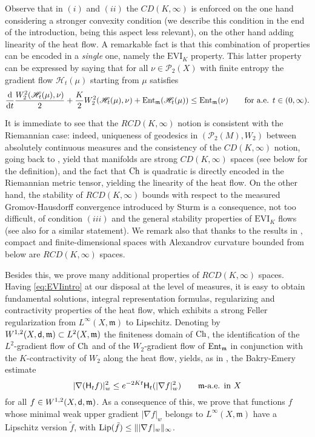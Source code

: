 \documentclass[reqno,11pt]{article}
\numberwithin{equation}{section}
\newcommand{\C}{\mathbb{C}}
\newcommand{\mm}{{\mbox{\boldmath$m$}}}
\newcommand{\sfd}{{\sf d}}
\renewcommand{\d}{{\mathrm d}}
\newcommand{\EVI}[4]{\mathrm{EVI}_{#4}(#1,{#2}_W,#3)}
\newcommand{\ProbabilitiesTwo}[1]{\mathscr P_2(#1)}     %
\newcommand{\entv}{{\rm Ent}_{\mm}}                    %
\newcommand{\probt}{\ProbabilitiesTwo}
\newcommand{\weakgrad}[1]{|\nabla #1|_w}                %
\renewcommand{\C}{{\rm Ch}}
\newcommand{\entr}[2]{{\rm Ent}_{#2}(#1)}              %
\newcommand{\rcd}[2]{RCD(#1,#2)}
\newcommand{\heatl}{{\sf H}}
\newcommand{\heatw}{{\mathscr H}}
\renewcommand{\EVI}{\ensuremath{\mathrm{EVI}}}
\renewcommand{\mm}{\mathfrak m}
\begin{document}
Observe that in $(i)$ and $(ii)$ the $CD(K,\infty)$ is enforced on
the one hand considering a stronger convexity condition (we describe
this condition in the end of the introduction, being this aspect
less relevant), on the other hand adding linearity of the heat flow.
A remarkable fact is that this combination of properties can be
encoded in a \emph{single} one, namely the $\EVI_K$ property. This
latter property can be expressed by saying that for all
$\nu\in\probt{X}$ with finite entropy the gradient flow
$\heatw_t(\mu)$ starting from $\mu$ satisfies
\begin{equation}\label{eq:EVIintro}
\frac \d{\d t}\frac{W_2^2(\heatw_t(\mu),\nu)}2+\frac
K2W^2_2(\heatw_t(\mu),\nu)+\entr{\heatw_t(\mu)}{\mm}\leq\entr{\nu}{\mm}\qquad\text{for
a.e. $t\in (0,\infty)$.}
\end{equation}

It is immediate to see that the $\rcd K\infty$ notion is consistent
with the Riemannian case: indeed, uniqueness of geodesics in
$(\probt M,W_2)$ between absolutely continuous measures and the
consistency of the $CD(K,\infty)$ notion, going back to
\cite{Cordero-McCann-Schmuckenschlager01,Sturm-VonRenesse05}, yield
that manifolds are strong $CD(K,\infty)$ spaces (see below for the
definition), and the fact that $\C$ is quadratic is directly encoded
in the Riemannian metric tensor, yielding the linearity of the heat
flow. On the other hand, the stability of $\rcd K\infty$ bounds with
respect to the measured Gromov-Hausdorff convergence introduced by
Sturm \cite{Sturm06I} is a consequence, not too difficult, of
condition $(iii)$ and the general stability properties of $\EVI_K$
flows (see also \cite{Savare07,Savare10} for a similar statement).
We remark also that thanks to the results in
\cite{Gigli-Ohta10,Ohta09,Petrunin,ZZ1}, compact and
finite-dimensional spaces with Alexandrov curvature bounded from
below are $\rcd K\infty$ spaces.

Besides this, we prove many additional properties of $\rcd K\infty$
spaces. Having \eqref{eq:EVIintro} at our disposal at the level of
measures, it is easy to obtain fundamental solutions, integral
representation formulas, regularizing and contractivity properties
of the heat flow, which exhibits a strong Feller regularization from
$L^\infty(X,\mm)$ to Lipschitz. Denoting by
$W^{1,2}(X,\sfd,\mm)\subset L^2(X,\mm)$ the finiteness domain of
$\C$, the identification of the $L^2$-gradient flow of $\C$ and of
the $W_2$-gradient flow of $\entv$ in conjunction with the
$K$-contractivity of $W_2$ along the heat flow, yields, as in
\cite{GigliKuwadaOhta10}, the Bakry-Emery estimate
$$
\weakgrad{(\heatl_t f)}^2\leq
e^{-2Kt}\heatl_t(\weakgrad{f}^2)\qquad\text{$\mm$-a.e. in $X$}
$$
for all $f\in W^{1,2}(X,\sfd,\mm)$. As a consequence of this, we
prove that functions $f$ whose minimal weak upper gradient
$\weakgrad{f}$ belongs to $L^\infty(X,\mm)$ have a Lipschitz version
$\tilde f$, with ${\rm Lip}(\tilde f)\leq\|\weakgrad{f}\|_\infty$.
\end{document}
